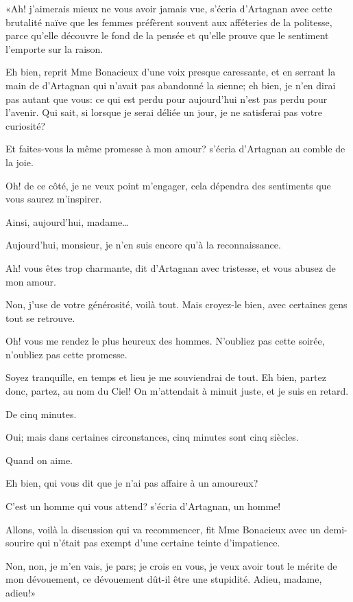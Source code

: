 «Ah! j'aimerais mieux ne vous avoir jamais vue, s'écria d'Artagnan avec cette brutalité naïve que les femmes préfèrent souvent aux afféteries de la politesse, parce qu'elle découvre le fond de la pensée et qu'elle prouve que le sentiment l'emporte sur la raison. 

\speak  Eh bien, reprit Mme Bonacieux d'une voix presque caressante, et en serrant la main de d'Artagnan qui n'avait pas abandonné la sienne; eh bien, je n'en dirai pas autant que vous: ce qui est perdu pour aujourd'hui n'est pas perdu pour l'avenir. Qui sait, si lorsque je serai déliée un jour, je ne satisferai pas votre curiosité? 

\speak  Et faites-vous la même promesse à mon amour? s'écria d'Artagnan au comble de la joie. 

\speak  Oh! de ce côté, je ne veux point m'engager, cela dépendra des sentiments que vous saurez m'inspirer. 

\speak  Ainsi, aujourd'hui, madame\dots 

\speak  Aujourd'hui, monsieur, je n'en suis encore qu'à la reconnaissance. 

\speak  Ah! vous êtes trop charmante, dit d'Artagnan avec tristesse, et vous abusez de mon amour. 

\speak  Non, j'use de votre générosité, voilà tout. Mais croyez-le bien, avec certaines gens tout se retrouve. 

\speak  Oh! vous me rendez le plus heureux des hommes. N'oubliez pas cette soirée, n'oubliez pas cette promesse. 

\speak  Soyez tranquille, en temps et lieu je me souviendrai de tout. Eh bien, partez donc, partez, au nom du Ciel! On m'attendait à minuit juste, et je suis en retard. 

\speak  De cinq minutes. 

\speak  Oui; mais dans certaines circonstances, cinq minutes sont cinq siècles. 

\speak  Quand on aime. 

\speak  Eh bien, qui vous dit que je n'ai pas affaire à un amoureux? 

\speak  C'est un homme qui vous attend? s'écria d'Artagnan, un homme! 

\speak  Allons, voilà la discussion qui va recommencer, fit Mme Bonacieux avec un demi-sourire qui n'était pas exempt d'une certaine teinte d'impatience. 

\speak  Non, non, je m'en vais, je pars; je crois en vous, je veux avoir tout le mérite de mon dévouement, ce dévouement dût-il être une stupidité. Adieu, madame, adieu!» 


